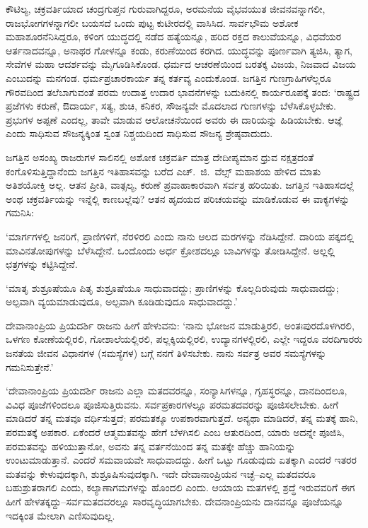 ಕೌಟಿಲ್ಯ, ಚಕ್ರವರ್ತಿಯಾದ ಚಂದ್ರಗುಪ್ತನ ಗುರುವಾಗಿದ್ದರೂ, ಅರಮನೆಯ ವೈಭವ\-ಯುತ ಜೀವನವನ್ನಾಗಲೀ, ರಾಜಭೋಗಗಳನ್ನಾಗಲೀ ಬಯಸದೆ ಒಂದು ಪುಟ್ಟ ಕುಟೀರದಲ್ಲಿ ವಾಸಿಸಿದ. ಸಾರ್ವಭೌಮ ಅಶೋಕ ಮಹಾಶೂರನೆನಿಸಿದ್ದರೂ, ಕಳಿಂಗ ಯುದ್ಧದಲ್ಲಿ ನಡೆದ ಹತ್ಯೆಯನ್ನೂ, ಹರಿದ ರಕ್ತದ ಕಾಲುವೆಯನ್ನೂ, ವಿಧವೆಯರ ಆರ್ತನಾದವನ್ನೂ, ಅನಾಥರ ಗೋಳನ್ನೂ ಕಂಡು, ಕರುಣೆಯಿಂದ ಕರಗಿದ. ಯುದ್ಧವನ್ನು ಪೂರ್ಣವಾಗಿ ತ್ಯಜಿಸಿ, ತ್ಯಾಗ, ಸೇವೆಗಳ ಮಹಾ ಆದರ್ಶವನ್ನು ಮೈಗೂಡಿಸಿಕೊಂಡ. ಧರ್ಮದ ಆಚರಣೆಯಿಂದ ಬರತಕ್ಕ ವಿಜಯ, ನಿಜವಾದ ವಿಜಯ ಎಂಬುದನ್ನು ಮನಗಂಡ. ಧರ್ಮಪ್ರಚಾರಕಾರ್ಯ ತನ್ನ ಕರ್ತವ್ಯ ಎಂದುಕೊಂಡ. ಜಗತ್ತಿನ ಗುಣಗ್ರಾಹಿಗಳೆಲ್ಲರೂ ಗೌರವದಿಂದ ತಲೆಬಾಗುವಂತೆ ಪರಮ ಉದಾತ್ತ ಉದಾರ ಭಾವನೆಗಳನ್ನು ಬದುಕಿನಲ್ಲಿ ಕಾರ್ಯರೂಪಕ್ಕೆ ತಂದ: ‘ರಾಷ್ಟ್ರದ ಪ್ರಜೆಗಳು ಕರುಣೆ, ಔದಾರ್ಯ, ಸತ್ಯ, ಶುಚಿ, ಕನಿಕರ, ಸೌಜನ್ಯವೇ ಮೊದಲಾದ ಗುಣಗಳನ್ನು ಬೆಳೆಸಿಕೊಳ್ಳಬೇಕು. ಪ್ರಭುಗಳ ಅಪ್ಪಣೆ ಎಂದಲ್ಲ, ತಾವೇ ಮಾಡುವ ಆಲೋಚನೆಯಿಂದ ಅವರು ಈ ದಾರಿಯನ್ನು ಹಿಡಿಯಬೇಕು. ಆಜ್ಞೆ ಎಂದು ಸಾಧಿಸುವ ಸೌಜನ್ಯಕ್ಕಿಂತ ಸ್ವಂತ ನಿಶ್ಚಯದಿಂದ ಸಾಧಿಸುವ ಸೌಜನ್ಯ ಶ್ರೇಷ್ಠವಾದುದು.

ಜಗತ್ತಿನ ಅಸಂಖ್ಯ ರಾಜರುಗಳ ಸಾಲಿನಲ್ಲಿ ಅಶೋಕ ಚಕ್ರವರ್ತಿ ಮಾತ್ರ ದೇದೀಪ್ಯಮಾನ ಧ್ರುವ ನಕ್ಷತ್ರದಂತೆ ಕಂಗೊಳಿಸುತ್ತಿದ್ದಾನೆಂದು ಜಗತ್ತಿನ ಇತಿಹಾಸವನ್ನು ಬರೆದ ಎಚ್.\ ಜಿ.\ ವೆಲ್ಸ್ ಮಹಾಶಯ ಹೇಳಿದ ಮಾತು ಅತಿಶಯೋಕ್ತಿ ಅಲ್ಲ. ಆತನ ಪ್ರೀತಿ, ವಾತ್ಸಲ್ಯ, ಕರುಣೆ ಪ್ರವಾಹಾಕಾರವಾಗಿ ಸರ್ವತ್ರ ಹರಿಯಿತು. ಜಗತ್ತಿನ ಇತಿಹಾಸದಲ್ಲೆ ಅಂಥ ಚಕ್ರವರ್ತಿಯನ್ನು ಇನ್ನೆಲ್ಲಿ ಕಾಣ\-ಬಲ್ಲೆವು? ಆತನ ಹೃದಯದ ಪರಿಚಯವನ್ನು ಮಾಡಿಕೊಡುವ ಈ ವಾಕ್ಯಗಳನ್ನು ಗಮನಿಸಿ:

‘ಮಾರ್ಗಗಳಲ್ಲಿ ಜನರಿಗೆ, ಪ್ರಾಣಿಗಳಿಗೆ, ನೆರಳಿರಲಿ ಎಂದು ನಾನು ಆಲದ ಮರಗಳನ್ನು ನೆಡಿಸಿದ್ದೇನೆ. ದಾರಿಯ ಪಕ್ಕದಲ್ಲಿ ಮಾವಿನತೋಪುಗಳನ್ನು ಬೆಳೆಸಿದ್ದೇನೆ. ಒಂದೊಂದು ಅರ್ಧ ಕ್ರೋಶದಲ್ಲೂ ಬಾವಿಗಳನ್ನು ತೋಡಿಸಿದ್ದೇನೆ. ಅಲ್ಲಲ್ಲಿ ಛತ್ರಗಳನ್ನು ಕಟ್ಟಿಸಿದ್ದೇನೆ.

‘ಮಾತೃ ಶುಶ್ರೂಷೆಯೂ ಪಿತೃ ಶುಶ್ರೂಷೆಯೂ ಸಾಧುವಾದದ್ದು; ಪ್ರಾಣಿಗಳನ್ನು ಕೊಲ್ಲದಿರುವುದು ಸಾಧುವಾದದ್ದು; ಅಲ್ಪವಾಗಿ ವ್ಯಯಮಾಡುವುದೂ, ಅಲ್ಪವಾಗಿ ಕೂಡಿಡುವುದೂ ಸಾಧು\-ವಾದದ್ದು.’

ದೇವಾನಾಂಪ್ರಿಯ ಪ್ರಿಯದರ್ಶಿ ರಾಜನು ಹೀಗೆ ಹೇಳುವನು: ‘ನಾನು ಭೋಜನ ಮಾಡು\-ತ್ತಿರಲಿ, ಅಂತಃಪುರದೊಳಗಿರಲಿ, ಒಳಗಣ ಕೋಣೆಯಲ್ಲಿರಲಿ, ಗೋಶಾಲೆಯಲ್ಲಿರಲಿ, ಪಲ್ಲಕ್ಕಿಯ\-ಲ್ಲಿರಲಿ, ಉದ್ಯಾನಗಳಲ್ಲಿರಲಿ, ಎಲ್ಲೇ ಇದ್ದರೂ ವರದಿಗಾರರು ಜನತೆಯ ಜೀವನ ವಿಧಾನಗಳ (ಸಮಸ್ಯೆಗಳ) ಬಗ್ಗೆ ನನಗೆ ತಿಳಿಸಬೇಕು. ನಾನು ಸರ್ವತ್ರ ಅವರ ಸಮಸ್ಯೆಗಳನ್ನು ಗಮನಿಸುತ್ತೇನೆ.’

‘ದೇವಾನಾಂಪ್ರಿಯ ಪ್ರಿಯದರ್ಶಿ ರಾಜನು ಎಲ್ಲಾ ಮತದವರನ್ನೂ, ಸಂನ್ಯಾಸಿಗಳನ್ನೂ, ಗೃಹಸ್ಥರನ್ನೂ, ದಾನದಿಂದಲೂ, ವಿವಿಧ ಪೂಜೆಗಳಿಂದಲೂ ಪೂಜಿಸುತ್ತಿರುವನು. ಸರ್ವಪ್ರಕಾರ\-ಗಳಲ್ಲೂ ಪರಮತದವರನ್ನು ಪೂಜಿಸಲೇಬೇಕು. ಹೀಗೆ ಮಾಡಿದರೆ ತನ್ನ ಮತವೂ ವರ್ಧಿಸುತ್ತದೆ; ಪರಮತಕ್ಕೂ ಉಪಕಾರವಾಗುತ್ತದೆ. ಅನ್ಯಥಾ ಮಾಡಿದರೆ, ತನ್ನ ಮತಕ್ಕೆ ಹಾನಿ, ಪರಮತಕ್ಕೆ ಅಪಕಾರ. ಏಕೆಂದರೆ ಆತ್ಮಮತವನ್ನು ಹೇಗೆ ಬೆಳಗಿಸಲಿ ಎಂಬ ಆತುರದಿಂದ, ಯಾರು ಅದನ್ನೇ ಪೂಜಿಸಿ, ಪರಮತವನ್ನು ಹಳಿಯುತ್ತಾನೋ, ಅವನು ತನ್ನ ವರ್ತನೆಯಿಂದ ತನ್ನ ಮತಕ್ಕೇ ಹೆಚ್ಚು ಹಾನಿಯನ್ನು ಉಂಟುಮಾಡುತ್ತಾನೆ. ಎಂದರೆ ಸಮವಾಯವೇ ಸಾಧುವಾದದ್ದು. ಹೀಗೆ ಒಟ್ಟು ಗೂಡುವುದು ಏತಕ್ಕಾಗಿ ಎಂದರೆ ಇತರರ ಮತವನ್ನು ಕೇಳುವುದಕ್ಕಾಗಿ, ಶುಶ್ರೂಷಿಸುವುದಕ್ಕಾಗಿ. ಇದೇ ದೇವಾನಾಂಪ್ರಿಯನ ಇಚ್ಛೆ–ಎಲ್ಲ ಮತದವರೂ ಬಹುಶ್ರುತರಾಗಲಿ ಎಂದು, ಕಲ್ಯಾಣಾಗಮಗಳನ್ನು ಹೊಂದಲಿ ಎಂದು. ಆಯಾಯ ಮತಗಳಲ್ಲಿ ಶ್ರದ್ಧೆ ಇರುವವರಿಗೆ ಈಗ ಹೀಗೆ ಹೇಳತಕ್ಕದ್ದು–ಸರ್ವಮತದವರಲ್ಲೂ ಸಾರವೃದ್ಧಿಯಾಗಬೇಕು. ದೇವನಾಂಪ್ರಿಯನು ದಾನವನ್ನೂ ಪೂಜೆಯನ್ನೂ ಇದಕ್ಕಿಂತ ಮೇಲಾಗಿ ಎಣಿಸುವುದಿಲ್ಲ.

